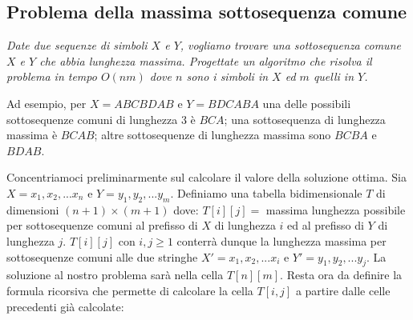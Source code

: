 \subsection{Problema della massima sottosequenza comune}
\textit{Date due sequenze di simboli $X$ e $Y$, vogliamo trovare una sottosequenza comune $X$ e $Y$ che abbia lunghezza massima. Progettate un algoritmo che risolva il problema in tempo $O(nm)$ dove $n$ sono i simboli in $X$ ed $m$ quelli in $Y$.}

Ad esempio, per $X = ABCBDAB$ e $Y = BDCABA$ una delle possibili sottosequenze comuni di lunghezza 3 è $BCA$; una sottosequenza di lunghezza massima è $BCAB$; altre sottosequenze di lunghezza massima sono $BCBA$ e $BDAB$.

Concentriamoci preliminarmente sul calcolare il valore della soluzione ottima. Sia $X = x_1,x_2,... x_n$ e $Y = y_1, y_2, ... y_m$. Definiamo una tabella bidimensionale $T$ di dimensioni $(n+1)\times (m+1)$ dove: $T[i][j]=$ massima lunghezza possibile per sottosequenze comuni al prefisso di $X$ di lunghezza $i$ ed al prefisso di $Y$ di lunghezza $j$. $T[i][j]$ con $i,j\geq 1$ conterrà dunque la lunghezza massima per sottosequenze comuni alle due stringhe $X'=x_1, x_2, ... x_i$ e $Y'=y_1, y_2, ... y_j$. La soluzione al nostro problema sarà nella cella $T[n][m]$. Resta ora da definire la formula ricorsiva che permette di calcolare la cella $T[i, j]$ a partire dalle celle precedenti già calcolate:

